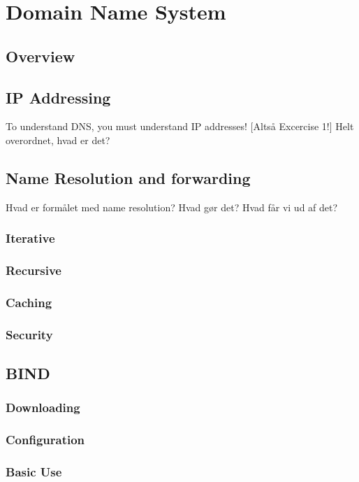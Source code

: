 \chapter{Domain Name System}
\section{Overview}
\section{IP Addressing}
To understand DNS, you must understand IP addresses! [Altså Excercise 1!]
Helt overordnet, hvad er det?
\section{Name Resolution and forwarding}
Hvad er formålet med name resolution? Hvad gør det? Hvad får vi ud af det?
\subsection{Iterative}
\subsection{Recursive}
\subsection{Caching}
\subsection{Security}
\section{BIND}
\subsection{Downloading}
\subsection{Configuration}
\subsection{Basic Use}

